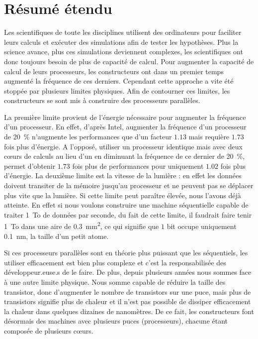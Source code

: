 
\chapter{Résumé étendu}

Les scientifiques de toute les disciplines utilisent des ordinateurs pour faciliter leurs calculs et exécuter des simulations afin de tester les hypothèses.
Plus la science avance, plus ces simulations deviennent complexes, les scientifiques ont donc toujours besoin de plus de capacité de calcul.
Pour augmenter la capacité de calcul de leurs processeurs, les constructeurs ont dans un premier temps augmenté la fréquence de ces derniers.
Cependant cette approche a vite été stoppée par plusieurs limites physiques.
Afin de contourner ces limites, les constructeurs se sont mis à construire des processeurs parallèles.

La première limite provient de l'énergie nécessaire pour augmenter la fréquence d'un processeur.
En effet, d'après \gls{Intel}, augmenter la fréquence d'un processeur de \SI{20}{\%} n'augmente les performances que d'un facteur $1.13$ mais requière $1.73$ fois plus d'énergie.
A l'opposé, utiliser un processeur identique mais avec deux cœurs de calculs au lieu d'un en diminuant la fréquence de ce dernier de \SI{20}{\%}, permet d'obtenir $1.73$ fois plus de performances pour uniquement $1.02$ fois plus d'énergie.
La deuxième limite est la vitesse de la lumière : en effet les données doivent transiter de la mémoire jusqu'au processeur et ne peuvent pas se déplacer plus vite que la lumière.
Si cette limite peut paraître élevée, nous l'avons déjà atteinte.
En effet si nous voulons construire une machine séquentielle capable de traiter \SI{1}{To} de données par seconde, du fait de cette limite, il faudrait faire tenir \SI{1}{To} dans une aire de \SI{0.3}{mm^2}, ce qui signifie que $1$ bit occupe uniquement \SI{0.1}{nm}, la taille d'un petit atome.

Si ces processeurs parallèles sont en théorie plus puissant que les séquentiels, les utiliser efficacement est bien plus complexe et c'est la responsabilisée des développeur.euse.s de le faire.
De plus, depuis plusieurs années nous sommes face à une autre limite physique.
Nous somme capable de réduire la taille des transistor, donc d'augmenter le nombre de transistors sur une puce, mais plus de transistors signifie plus de chaleur et il n'est pas possible de dissiper efficacement la chaleur dans quelques dizaines de nanomètres.
De ce fait, les constructeurs font désormais des machines avec plusieurs puces (processeurs), chacune étant composée de plusieurs cœurs.

